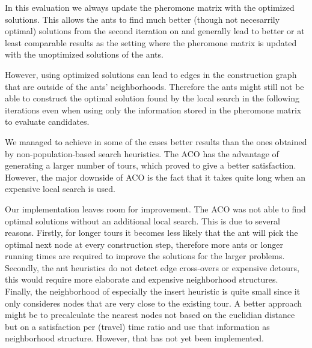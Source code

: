 \documentclass{article}
\begin{document}
In this evaluation we always update the pheromone matrix with the optimized solutions. This allows the ants to find much better (though not
necesarrily optimal) solutions from the second iteration on and generally lead to better or at least comparable results as the setting where
the pheromone matrix is updated with the unoptimized solutions of the ants.

However, using optimized solutions can lead to edges in the construction graph that are outside of the ants' neighborhoods. Therefore the
ants might still not be able to construct the optimal solution found by the local search in the following iterations even when using only
the information stored in the pheromone matrix to evaluate candidates.
\medskip

We managed to achieve in some of the cases better results than the ones obtained by non-population-based search heuristics. 
The ACO has the advantage of generating a larger number of tours, which proved to give a better satisfaction. 
However, the major downside of ACO is the fact that it takes quite long when an expensive local search is used.

Our implementation leaves room for improvement.
The ACO was not able to find optimal solutions without an additional local search. This is due to several reasons.
Firstly, for longer tours it becomes less likely that the ant will pick the optimal next node at every construction step, therefore more ants
or longer running times are required to improve the solutions for the larger problems. Secondly, the ant heuristics do not detect 
edge cross-overs or expensive detours, this would require more elaborate and expensive neighborhood structures. Finally, the neighborhood of
especially the insert heuristic is quite small since it only consideres nodes that are very close to the existing tour. 
A better approach might be to precalculate the nearest nodes not based on the euclidian distance but on a satisfaction per (travel) time ratio and 
use that information as neighborhood structure. However, that has not yet been implemented.
\end{document}

